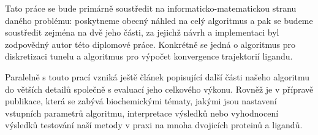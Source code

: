 Tato práce se bude primárně soustředit na informaticko-matematickou stranu
daného problému: poskytneme obecný náhled na celý algoritmus a pak se budeme
soustředit zejména na dvě jeho části, za jejichž návrh a implementaci byl
zodpovědný autor této diplomové práce. Konkrétně se jedná o algoritmus pro
diskretizaci tunelu a algoritmus pro výpočet konvergence trajektorií ligandu.

Paralelně s touto prací vzniká ještě článek popisující další části našeho algoritmu
do větších detailů společně s evaluací jeho celkového výkonu. Rovněž je v přípravě
publikace, která se zabývá biochemickými tématy, jakými jsou nastavení
vstupních parametrů algoritmu, interpretace výsledků nebo vyhodnocení výsledků
testování naší metody v praxi na mnoha dvojicích proteinů a ligandů.

